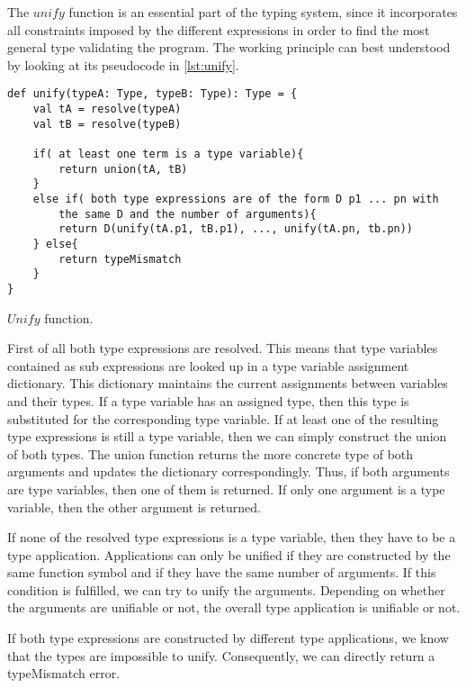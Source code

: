 The $unify$ function is an essential part of the typing system, since it incorporates all constraints imposed by the different expressions in order to find the most general type validating the program.
The working principle can best understood by looking at its pseudocode in \cref{lst:unify}.
\begin{listing}[!h]
	\begin{CenteredBox}
		\begin{lstlisting}[language=inform]
def unify(typeA: Type, typeB: Type): Type = {
	val tA = resolve(typeA)
	val tB = resolve(typeB)

	if( at least one term is a type variable){
		return union(tA, tB)
	}
    else if( both type expressions are of the form D p1 ... pn with 
		the same D and the number of arguments){
		return D(unify(tA.p1, tB.p1), ..., unify(tA.pn, tb.pn))
	} else{
		return typeMismatch
	}
}
		\end{lstlisting}
	\end{CenteredBox}
	\caption{$Unify$ function.}
	\label{lst:unify}
\end{listing}

First of all both type expressions are resolved.
This means that type variables contained as sub expressions are looked up in a type variable assignment dictionary.
This dictionary maintains the current assignments between variables and their types.
If a type variable has an assigned type, then this type is substituted for the corresponding type variable.
If at least one of the resulting type expressions is still a type variable, then we can simply construct the union of both types.
The union function returns the more concrete type of both arguments and updates the dictionary correspondingly.
Thus, if both arguments are type variables, then one of them is returned.
If only one argument is a type variable, then the other argument is returned.

If none of the resolved type expressions is a type variable, then they have to be a type application.
Applications can only be unified if they are constructed by the same function symbol and if they have the same number of arguments.
If this condition is fulfilled, we can try to unify the arguments.
Depending on whether the arguments are unifiable or not, the overall type application is unifiable or not.

If both type expressions are constructed by different type applications, we know that the types are impossible to unify.
Consequently, we can directly return a typeMismatch error.

